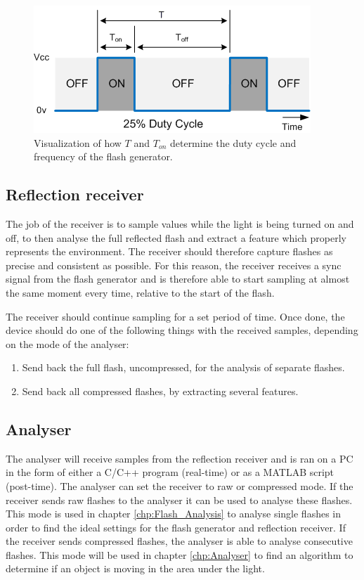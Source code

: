 \begin{figure}[]
	\centering
	\includegraphics[]{pics/DutyCycle.png}
	\caption{Visualization of how $T$ and $T_{on}$ determine the duty cycle and frequency of the flash generator.\label{fig:DutyCycle}}
\end{figure}

\subsection{Reflection receiver}
The job of the receiver is to sample values while the light is being turned on and off, to then analyse the full reflected flash and extract a feature which properly represents the environment. The receiver should therefore capture flashes as precise and consistent as possible. For this reason, the receiver receives a sync signal from the flash generator and is therefore able to start sampling at almost the same moment every time, relative to the start of the flash. 

The receiver should continue sampling for a set period of time. Once done, the device should do one of the following things with the received samples, depending on the mode of the analyser:
\begin{enumerate}[itemsep=-1ex,topsep=0pt]
	\item Send back the full flash, uncompressed, for the analysis of separate flashes.
	\item Send back all compressed flashes, by extracting several features.
\end{enumerate}

\subsection{Analyser}
The analyser will receive samples from the reflection receiver and is ran on a PC in the form of either a C/C++ program (real-time) or as a MATLAB script (post-time). The analyser can set the receiver to raw or compressed mode. If the receiver sends raw flashes to the analyser it can be used to analyse these flashes. This mode is used in chapter \ref{chp:Flash_Analysis} to analyse single flashes in order to find the ideal settings for the flash generator and reflection receiver. If the receiver sends compressed flashes, the analyser is able to analyse consecutive flashes. This mode will be used in chapter \ref{chp:Analyser} to find an algorithm to determine if an object is moving in the area under the light.

